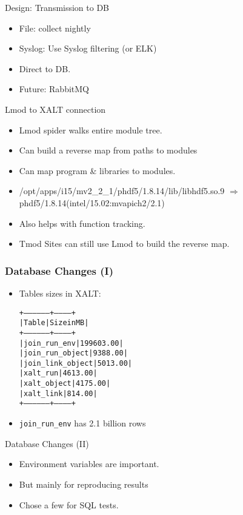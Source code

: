 \documentclass{beamer}
\begin{document}
\begin{frame}{Design: Transmission to DB}
  \begin{itemize}
    \item File: collect nightly
    \item Syslog: Use Syslog filtering (or ELK)
    \item Direct to DB.
    \item Future: RabbitMQ
  \end{itemize}
\end{frame}

\begin{frame}{Lmod to XALT connection}
  \begin{itemize}
    \item Lmod spider walks entire module tree.
    \item Can build a reverse map from paths to modules
    \item Can map program \& libraries to modules.
    \item /opt/apps/i15/mv2\_2\_1/phdf5/1.8.14/lib/libhdf5.so.9
      $\Rightarrow$ phdf5/1.8.14(intel/15.02:mvapich2/2.1)
    \item Also helps with function tracking.
    \item Tmod Sites can still use Lmod to build the reverse map.
  \end{itemize}
\end{frame}

\begin{frame}[fragile]
    \frametitle{Database Changes (I)}
  \begin{itemize}
      \item Tables sizes in XALT:
 {\small
    \begin{alltt}
+------------------+------------+
| Table            | Size in MB |
+------------------+------------+
| join_run_env     |  199603.00 |
| join_run_object  |    9388.00 |
| join_link_object |    5013.00 |
| xalt_run         |    4613.00 |
| xalt_object      |    4175.00 |
| xalt_link        |     814.00 |
+------------------+------------+
    \end{alltt}
}
    \item \texttt{join\_run\_env} has 2.1 billion rows
  \end{itemize}
\end{frame}

\begin{frame}{Database Changes (II)}
  \begin{itemize}
    \item Environment variables are important.
    \item But mainly for reproducing results
    \item Chose a few for SQL tests.
  \end{itemize}
\end{frame}
\end{document}
